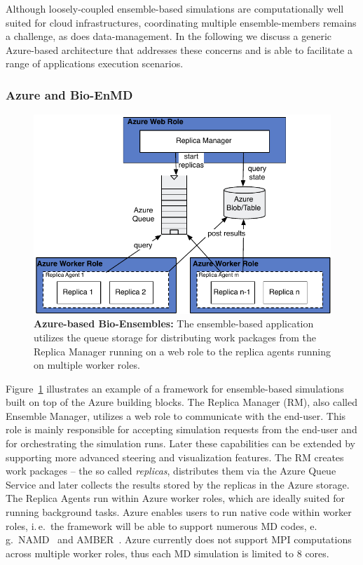 \documentclass[3p,twocolumn]{elsarticle}
\begin{document}
Although loosely-coupled ensemble-based simulations are
computationally well suited for cloud infrastructures, coordinating
multiple ensemble-members remains a challenge, as does
data-management.
In the following we discuss a generic Azure-based architecture that
addresses these concerns and is able to facilitate a range of
applications execution scenarios.

\subsubsection{Azure and Bio-EnMD}
\begin{figure}%
   \includegraphics[width=.4\textwidth]{figures/re-azure}
    \caption{\textbf{Azure-based Bio-Ensembles:} The ensemble-based
      application utilizes the queue storage for distributing work
      packages from the Replica Manager running on a web role to the
      replica agents running on multiple worker roles.}
    \label{fig:figures_re_azure}
\end{figure}
Figure~\ref{fig:figures_re_azure} illustrates an example of a
framework for ensemble-based simulations built on top of the Azure
building blocks. The Replica Manager (RM), also called Ensemble
Manager, utilizes a web role to communicate with the end-user. This
role is mainly responsible for accepting simulation requests from the
end-user and for orchestrating the simulation runs. Later these
capabilities can be extended by supporting more advanced steering and
visualization features. The RM creates work packages -- the so called
\emph{replicas}, distributes them via the Azure Queue Service and
later collects the results stored by the replicas in the Azure
storage.  The Replica Agents run within Azure worker roles, which are
ideally suited for running background tasks. Azure enables users to
run native code within worker roles, i.\,e.\ the framework will be
able to support numerous MD codes, e.\,g.\ NAMD~\cite{Phillips:2005gd}
and AMBER~\cite{cheatham-5}.  Azure currently does not support MPI
computations across multiple worker roles, thus each MD
simulation is limited to 8 cores.
\end{document}
